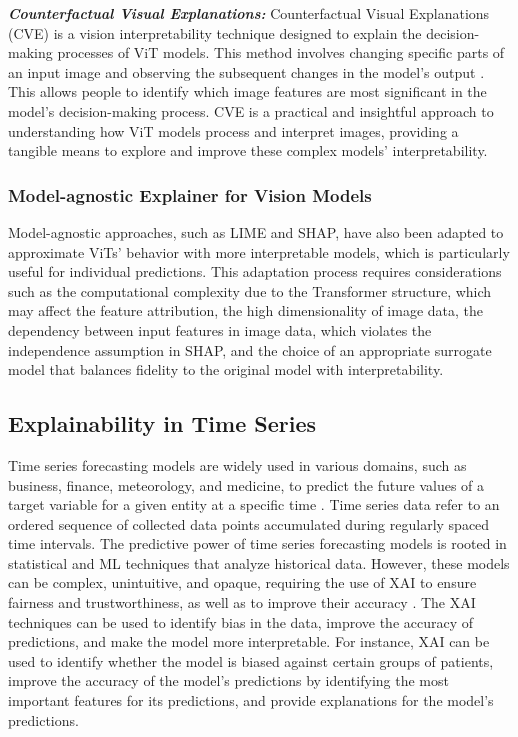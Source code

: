 \documentclass[final,5p,times,twocolumn]{elsarticle}
\begin{document}
\textbf{\textit{Counterfactual Visual Explanations:}}
Counterfactual Visual Explanations (CVE) is a vision interpretability technique designed to explain the decision-making processes of ViT models. This method involves changing specific parts of an input image and observing the subsequent changes in the model's output \cite{verma2020counterfactual, guidotti2022counterfactual}. This allows people to identify which image features are most significant in the model's decision-making process. CVE is a practical and insightful approach to understanding how ViT models process and interpret images, providing a tangible means to explore and improve these complex models' interpretability.

\subsubsection{Model-agnostic Explainer for Vision Models}
Model-agnostic approaches, such as LIME and SHAP, have also been adapted to approximate ViTs' behavior with more interpretable models, which is particularly useful for individual predictions. This adaptation process requires considerations such as the computational complexity due to the Transformer structure, which may affect the feature attribution, the high dimensionality of image data, the dependency between input features in image data, which violates the independence assumption in SHAP, and the choice of an appropriate surrogate model that balances fidelity to the original model with interpretability.


\subsection{Explainability in Time Series}
Time series forecasting models are widely used in various domains, such as business, finance, meteorology, and medicine, to predict the future values of a target variable for a given entity at a specific time \cite{shumway2000time,lim2021time}. Time series data refer to an ordered sequence of collected data points accumulated during regularly spaced time intervals. The predictive power of time series forecasting models is rooted in statistical and ML techniques that analyze historical data. However, these models can be complex, unintuitive, and opaque, requiring the use of XAI to ensure fairness and trustworthiness, as well as to improve their accuracy \cite{verma2020time}. The XAI techniques can be used to identify bias in the data, improve the accuracy of predictions, and make the model more interpretable. For instance, XAI can be used to identify whether the model is biased against certain groups of patients, improve the accuracy of the model's predictions by identifying the most important features for its predictions, and provide explanations for the model's predictions.
\end{document}
